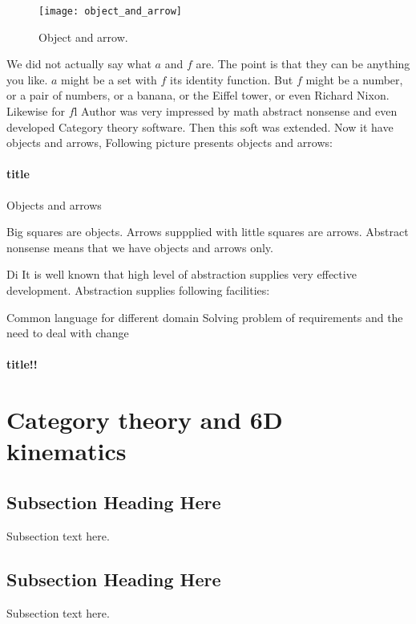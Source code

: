 \documentclass[10pt,journal,compsoc]{IEEEtran}
\begin{document}
		\begin{figure}[!t]
	\centering
	\texttt{[image: object\_and\_arrow]}
	\caption{Object and arrow.}
	\label{obj_and_arrow}
\end{figure}
	
	We did not actually say what $a$ and $f$ are. The point is that they can be anything you like. $a$ might be a set with $f$ its identity function. But $f$ might be a number, or a pair of numbers, or a banana, or the Eiffel tower, or even Richard Nixon. Likewise for $f$l Author was very impressed by math abstract nonsense and even developed Category theory software. Then this soft was extended. Now it have objects and arrows, Following picture presents objects and arrows:
	\paragraph{title}
	Objects and arrows
	
	Big squares are objects. Arrows suppplied with little squares are arrows. Abstract nonsense means that we have objects and arrows only.
	
	Di
	It is well known that high level of abstraction supplies very effective development. Abstraction supplies following facilities:
	
	Common language for different domain
	Solving problem of requirements and the need to deal with change
	
	\paragraph{title!!}
	\section{Category theory and 6D kinematics}
	
	\subsection{Subsection Heading Here}
	Subsection text here.
	
	
	
	\subsection{Subsection Heading Here}
	Subsection text here.
	
	
\end{document}
